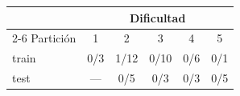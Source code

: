 \begin{tabular}{@{}lccccc@{}}
\toprule
 & \multicolumn{5}{c}{Dificultad}\\
\cmidrule(l){2-6}
Partición & 1 & 2 & 3 & 4 & 5\\
\midrule
train & 0/3 & 1/12 & 0/10 & 0/6 & 0/1 \\
test & --- & 0/5 & 0/3 & 0/3 & 0/5 \\
\bottomrule
\end{tabular}
